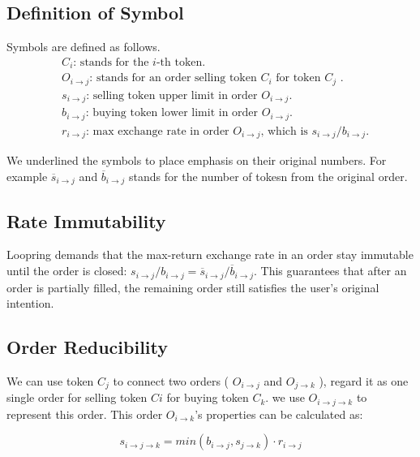 \documentclass[UTF8,nofonts]{article}
\begin{document}
\subsection{Definition of Symbol}

Symbols are defined as follows.
\[
\begin{split}
&C_{i}\text{: \ }\text{stands for the $i$-th token.}\\
&O_{i\rightarrow j}\text{: \ }\text{stands for an order selling token $C_{i}$ for token $C_{j}$ .}\\
&s_{i\rightarrow j}\text{: \ }\text{selling token upper limit in order $O_{i\rightarrow j}$.}\\
&b_{i\rightarrow j}\text{: \ }\text{buying token lower limit in order $O_{i\rightarrow j}$.}\\
&r_{i\rightarrow j}\text{: \ }\text{max exchange rate in order $O_{i\rightarrow j}$, which is $s_{i\rightarrow j} / b_{i\rightarrow j}$.}
\end{split}
\]


We underlined the symbols to place emphasis on their original numbers. For example $\overline{s}_{i\rightarrow j}$ and $\overline{b}_{i\rightarrow j}$ stands for the number of tokesn from the original order.

\subsection{Rate Immutability\label{sec: consistrate}}

Loopring demands that the max-return exchange rate in an order stay immutable until the order is closed: 
$s_{i\rightarrow j} / b_{i\rightarrow j} = \overline{s}_{i\rightarrow j}/ \overline{b}_{i\rightarrow j}$. This guarantees that after an order is partially filled, the remaining order still satisfies the user's original intention.

\subsection{Order Reducibility\label{sec: reducibility}}


We can use token $C_j$ to connect two orders ( $O_{i\rightarrow j}$ and $O_{j\rightarrow k}$ ), regard it as one single order for selling token $Ci$ for buying token $C_k$. we use $O_{i\rightarrow j\rightarrow k}$ to represent this order. This order $O_{i\rightarrow k}$'s properties can be calculated as: 

\begin{equation}
s_{i\rightarrow j\rightarrow k}=min(b_{i\rightarrow j}, s_{j\rightarrow k}) \cdot r_{i\rightarrow j}
\end{equation}
\end{document}

